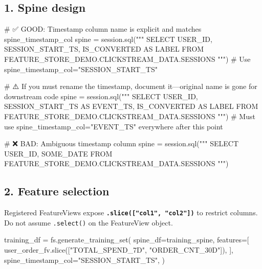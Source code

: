 \documentclass[
  letterpaper,
  DIV=11,
  numbers=noendperiod]{scrreprt}
\newenvironment{Shaded}{\begin{snugshade}}{\end{snugshade}}
\newcommand{\BuiltInTok}[1]{\textcolor[rgb]{0.00,0.23,0.31}{#1}}
\newcommand{\CommentTok}[1]{\textcolor[rgb]{0.37,0.37,0.37}{#1}}
\newcommand{\NormalTok}[1]{\textcolor[rgb]{0.00,0.23,0.31}{#1}}
\newcommand{\OperatorTok}[1]{\textcolor[rgb]{0.37,0.37,0.37}{#1}}
\newcommand{\StringTok}[1]{\textcolor[rgb]{0.13,0.47,0.30}{#1}}
\begin{document}
\hypertarget{spine-design-1}{%
\subsection{1. Spine design}\label{spine-design-1}}

\begin{Shaded}
\begin{Highlighting}[]
\CommentTok{\# ✅ GOOD: Timestamp column name is explicit and matches spine\_timestamp\_col}
\NormalTok{spine }\OperatorTok{=}\NormalTok{ session.sql(}\StringTok{"""}
\StringTok{    SELECT}
\StringTok{        USER\_ID,}
\StringTok{        SESSION\_START\_TS,}
\StringTok{        IS\_CONVERTED AS LABEL}
\StringTok{    FROM FEATURE\_STORE\_DEMO.CLICKSTREAM\_DATA.SESSIONS}
\StringTok{"""}\NormalTok{)}
\CommentTok{\# Use spine\_timestamp\_col="SESSION\_START\_TS"}

\CommentTok{\# ⚠️ If you must rename the timestamp, document it—original name is gone for downstream code}
\NormalTok{spine }\OperatorTok{=}\NormalTok{ session.sql(}\StringTok{"""}
\StringTok{    SELECT}
\StringTok{        USER\_ID,}
\StringTok{        SESSION\_START\_TS AS EVENT\_TS,}
\StringTok{        IS\_CONVERTED AS LABEL}
\StringTok{    FROM FEATURE\_STORE\_DEMO.CLICKSTREAM\_DATA.SESSIONS}
\StringTok{"""}\NormalTok{)}
\CommentTok{\# Must use spine\_timestamp\_col="EVENT\_TS" everywhere after this point}

\CommentTok{\# ❌ BAD: Ambiguous timestamp column}
\NormalTok{spine }\OperatorTok{=}\NormalTok{ session.sql(}\StringTok{"""}
\StringTok{    SELECT}
\StringTok{        USER\_ID,}
\StringTok{        SOME\_DATE}
\StringTok{    FROM FEATURE\_STORE\_DEMO.CLICKSTREAM\_DATA.SESSIONS}
\StringTok{"""}\NormalTok{)}
\end{Highlighting}
\end{Shaded}

\hypertarget{feature-selection}{%
\subsection{2. Feature selection}\label{feature-selection}}

Registered FeatureViews expose
\textbf{\texttt{.slice({[}"col1",\ "col2"{]})}} to restrict columns. Do
not assume \texttt{.select()} on the FeatureView object.

\begin{Shaded}
\begin{Highlighting}[]
\NormalTok{training\_df }\OperatorTok{=}\NormalTok{ fs.generate\_training\_set(}
\NormalTok{    spine\_df}\OperatorTok{=}\NormalTok{training\_spine,}
\NormalTok{    features}\OperatorTok{=}\NormalTok{[}
\NormalTok{        user\_order\_fv.}\BuiltInTok{slice}\NormalTok{([}\StringTok{"TOTAL\_SPEND\_7D"}\NormalTok{, }\StringTok{"ORDER\_CNT\_30D"}\NormalTok{]),}
\NormalTok{    ],}
\NormalTok{    spine\_timestamp\_col}\OperatorTok{=}\StringTok{"SESSION\_START\_TS"}\NormalTok{,}
\NormalTok{)}
\end{Highlighting}
\end{Shaded}
\end{document}
